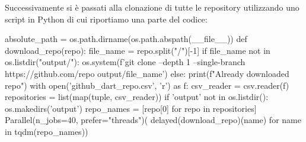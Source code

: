 Successivamente si è passati alla clonazione di tutte le repository utilizzando uno script in Python di cui riportiamo una parte del codice:

\begin{python}
absolute_path = os.path.dirname(os.path.abspath(__file__))
def download_repo(repo):
    file_name = repo.split("/")[-1]
    if file_name not in os.listdir("output/"):
        os.system(f'git clone --depth 1 --single-branch https://github.com/{repo} output/{file_name}')
    else:
        print(f"Already downloaded {repo}")
with open('github_dart_repo.csv', 'r') as f:
    csv_reader = csv.reader(f)
    repositories = list(map(tuple, csv_reader))
if 'output' not in os.listdir():
    os.makedirs('output')
repo_names = [repo[0] for repo in repositories]
Parallel(n_jobs=40, prefer="threads")(
    delayed(download_repo)(name) for name in tqdm(repo_names))
\end{python}
\begin{lstlisting}[frame=none,caption={Codice python per il clone automatico delle repository\protect\footnote{Codice python per il clone automatico delle repository}},captionpos=b,label=pythonclonegithub]
\end{lstlisting}

